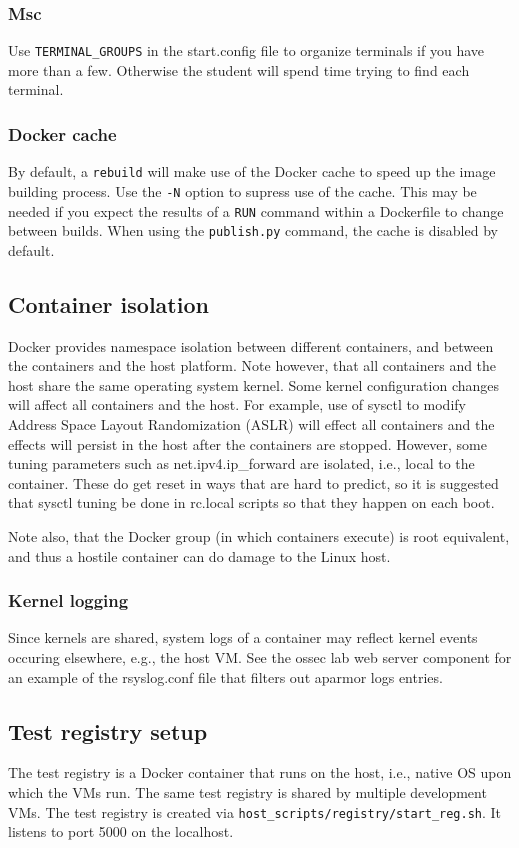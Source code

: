 \documentclass[12pt]{article}
\begin{document}
\subsubsection{Msc}
Use {\tt TERMINAL\_GROUPS} in the start.config file to organize terminals if you have more
than a few.  Otherwise the student will spend time trying to find each terminal.

\subsubsection {Docker cache}
By default, a {\tt rebuild} will make use of the Docker cache to speed up the image building process.
Use the {\tt -N} option to supress use of the cache.  This may be needed if you expect the results of
a {\tt RUN} command within a Dockerfile to change between builds.  When using the {\tt publish.py} command,
the cache is disabled by default.

\subsection {Container isolation}
Docker provides namespace isolation between different containers, and
between the containers and the host platform.  Note however, that all
containers and the host share the same operating system kernel.  Some
kernel configuration changes will affect all containers and the host.  For example,
use of sysctl to modify Address Space Layout Randomization (ASLR) will effect
all containers and the effects will persist in the host after the containers
are stopped.  However, some tuning parameters such as net.ipv4.ip\_forward are
isolated, i.e., local to the container. These do get reset in ways that are
hard to predict, so it is suggested that sysctl tuning be done in rc.local
scripts so that they happen on each boot.

Note also, that the Docker group (in which containers execute) is root 
equivalent, and thus a hostile container can do damage to the Linux host.

\subsubsection{Kernel logging}
Since kernels are shared, system logs of a container may reflect kernel events occuring
elsewhere, e.g., the host VM.  See the ossec lab web server component for an example
of the rsyslog.conf file that filters out aparmor logs entries.

\subsection {Test registry setup}
The test registry is a Docker container that runs on the host, i.e., native OS
upon which the VMs run.  The same test registry is shared by multiple development VMs.
The test registry is created via {\tt host\_scripts/registry/start\_reg.sh}.  It listens
to port 5000 on the localhost.
\end{document}
